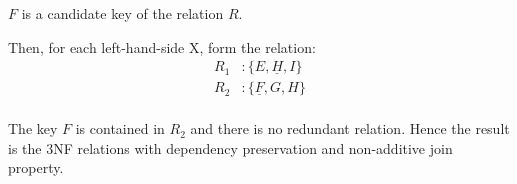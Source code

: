 \documentclass[12pt,letterpaper,titlepage,en-US]{article}
\begin{document}
\begin{homeworkProblem}
\begin{enumerate}[label=\textbf{Step {\arabic*}}, leftmargin=2cm]
            $F$ is a candidate key of the relation $R$.
    \end{enumerate}

Then, for each left-hand-side X, form the relation:
        \begin{align*}
            R_1& : \{E, \underline{H}, I\} \\
            R_2& : \{\underline{F}, G, H\} \\
        \end{align*}

The key $F$ is contained in $R_2$ and there is no redundant relation.
Hence the result is the 3NF relations with dependency preservation and non-additive join property.
\end{homeworkProblem}


\begin{homeworkProblem}
\lstset{language=SQL}

\end{homeworkProblem}
\end{document}
